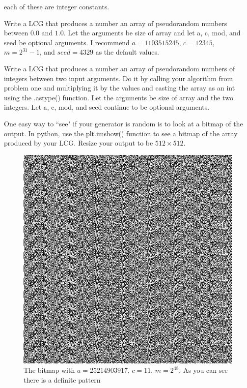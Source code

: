 each of these are integer constants.



\begin{problem}
Write a LCG that produces a number an array of pseudorandom numbers between $0.0$ and $1.0$. Let the arguments be size of array and let a, c, mod, and seed be optional arguments. I recommend $a=1103515245$, $c=12345$, $m=2^{31}-1$, and $seed=4329$ as the default values.
\end{problem}

\begin{problem}
Write a LCG that produces a number an array of pseudorandom numbers of integers between two input arguments. Do it by calling your algorithm from problem one and multiplying it by the values and casting the array as an int using the .astype() function. Let the arguments be size of array and the two integers. Let a, c, mod, and seed continue to be optional arguments.
\end{problem}

One easy way to ``see" if your generator is random is to look at a bitmap of the output. In python, use the plt.imshow() function to see a bitmap of the array produced by your LCG. Resize your output to be $512 \times 512$. 

\begin{figure}[H]
\includegraphics[scale = .4]{PRNG1.jpg}
\caption{The bitmap with $a=25214903917$, $c=11$, $m=2^{48}$. As you can see there is a definite pattern}
\end{figure}

